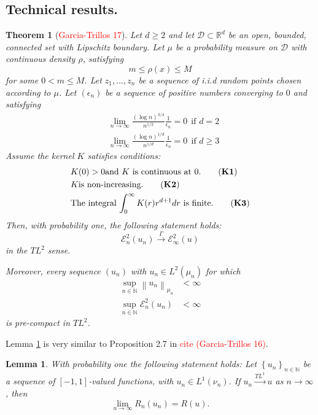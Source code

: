 \documentclass{article}
\newcommand{\Reals}{\mathbb{R}}
\newcommand{\norm}[1]{\left\lVert#1\right\rVert}
\newcommand{\set}[1]{\left\{#1\right\}}
\newcommand{\seq}[1]{\set{#1}_{n \in \N}}
\newcommand{\Naturals}{\mathbb{N}}
\newcommand{\Rd}{\Reals^d}
\newcommand{\N}{\mathbb{N}}
\newcommand{\E}{\mathcal{E}}
\newcommand{\Dset}{\mathcal{D}}
\newcommand{\1}{\mathbf{1}}
\theoremstyle{alden}
\theoremstyle{aldenthm}
\newtheorem{theorem}{Theorem}
\newtheorem{lemma}{Lemma}
\theoremstyle{remark}
\begin{document}
\subsection{Technical results.}

\begin{theorem}[\textcolor{red}{Garcia-Trillos 17}]
	\label{thm: garciatrillos17}
	Let $d \geq 2$ and let $\Dset \subset \Rd$ be an open, bounded, connected set with Lipschitz boundary. Let $\mu$ be a probability measure on $\Dset$ with continuous density $\rho$, satisfying 
	\begin{equation*}
	m \leq \rho(x) \leq M \tag{$\forall x \in D$}
	\end{equation*}
	for some $0 < m \leq M$. Let $z_1, \ldots, z_n$ be a sequence of i.i.d random points chosen according to $\mu$. Let $(\epsilon_n)$ be a sequence of positive numbers converging to $0$ and satisfying
	\begin{align*}
	& \lim_{n \to \infty} \frac{(\log n)^{3/4}}{n^{1/2}} \frac{1}{\epsilon_n} = 0 ~~ \text{if $d = 2$} \\
	& \lim_{n \to \infty} \frac{(\log n)^{1/d}}{n^{1/d}} \frac{1}{\epsilon_n} = 0 ~~ \text{if $d \geq 3$}
	\end{align*}
	Assume the kernel $K$ satisfies conditions: 
	\begin{align*}
	& K(0) > 0 \text{and $K$ is continuous at $0$.} \tag{\textbf{K1}} \\
	& K \text{is non-increasing.} \tag{\textbf{K2}} \\
	& \text{The integral $\int_{0}^{\infty} K(r) r^{d+1} dr$ is finite.} \tag{\textbf{K3}}
	\end{align*}
	Then, with probability one, the following statement holds:
	\begin{equation*}
	\E_n^2(u_n) \overset{\Gamma}{\to} \E_{\infty}^2(u)
	\end{equation*}
	in the $TL^2$ sense.
	
	Moreover, every sequence $(u_n)$ with $u_n \in L^2(\mu_n)$ for which
	\begin{align*}
	\sup_{n \in \Naturals} \norm{u_n}_{\mu_n} & < \infty \\
	\sup_{n \in \Naturals} \E_n^2(u_n) & < \infty
	\end{align*}
	is pre-compact in $TL^2$.
\end{theorem}




Lemma \ref{lem: conv_of_risk_functional} is very similar to Proposition 2.7 in \textcolor{red}{cite (Garcia-Trillos 16)}.  
\begin{lemma}
	\label{lem: conv_of_risk_functional}
	With probability one the following statement holds: Let $\seq{u_n}$ be a sequence of $[-1,1]$-valued functions, with $u_n \in L^1(\nu_n)$. If $u_n \overset{TL^1}{\to} u$ as $n \to \infty$, then
	\begin{equation*}
	\lim_{n \to \infty} R_n(u_n) = R(u).
	\end{equation*}
\end{lemma}
\end{document}
